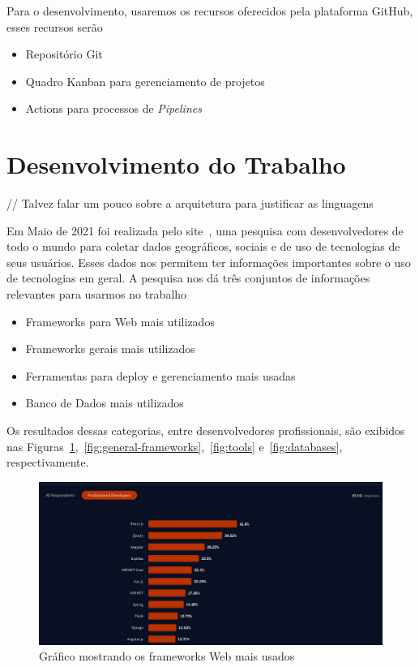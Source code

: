 \documentclass[12pt]{article}
\begin{document}
Para o desenvolvimento, usaremos os recursos oferecidos pela plataforma GitHub, esses recursos serão

\begin{itemize}
  \item Repositório Git
  \item Quadro Kanban para gerenciamento de projetos
  \item Actions para processos de \textit{Pipelines}
\end{itemize}

\section{Desenvolvimento do Trabalho}

// Talvez falar um pouco sobre a arquitetura para justificar as linguagens

Em Maio de 2021 foi realizada pelo site~\cite{stack11}, uma pesquisa com desenvolvedores de todo o mundo para
coletar dados geográficos, sociais e de uso de tecnologias de seus usuários. Esses dados nos permitem ter
informações importantes sobre o uso de tecnologias em geral. A pesquisa nos dá três conjuntos
de informações relevantes para usarmos no trabalho

\begin{itemize}
  \item Frameworks para Web mais utilizados
  \item Frameworks gerais mais utilizados
  \item Ferramentas para deploy e gerenciamento mais usadas
  \item Banco de Dados mais utilizados
\end{itemize}

Os resultados dessas categorias, entre desenvolvedores profissionais, são exibidos nas
Figuras~\ref{fig:web-frameworks},~\ref{fig:general-frameworks},~\ref{fig:tools} e~\ref{fig:databases}, respectivamente.

\begin{figure}[H]
  \centering
  \includegraphics[width=1\textwidth]{web_frameworks_usage.png}
  \caption{Gráfico mostrando os frameworks Web mais usados}\label{fig:web-frameworks}
\end{figure}
\end{document}
